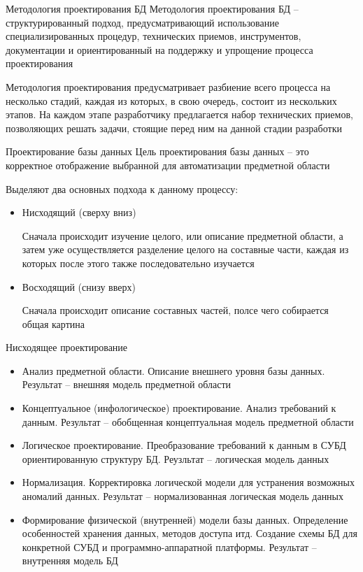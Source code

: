 \documentclass[12pt]{article}
\begin{document}
\begin{defin}{Методология проектирования БД}
    Методология проектирования БД -- структурированный подход, предусматривающий использование специализированных процедур, технических приемов, инструментов, документации и ориентированный на поддержку и упрощение процесса проектирования 

    Методология проектирования предусматривает разбиение всего процесса на несколько стадий, каждая из которых, в свою очередь, состоит из нескольких этапов. На каждом этапе разработчику предлагается набор технических приемов, позволяющих решать задачи, стоящие перед ним на данной стадии разработки 
\end{defin}

\begin{defin}{Проектирование базы данных}
    Цель проектирования базы данных -- это корректное отображение выбранной для автоматизации предметной области 

    Выделяют два основных подхода к данному процессу: 

    \begin{itemize}
        \item Нисходящий (сверху вниз)
        
        Сначала происходит изучение целого, или описание предметной области, а затем уже осуществляется разделение целого на составные части, каждая из которых после этого также последовательно изучается

        \item Восходящий (снизу вверх)
        
        Сначала происходит описание составных частей, полсе чего собирается общая картина 
    \end{itemize}
\end{defin}

\begin{defin}{Нисходящее проектирование}
    \begin{itemize}
        \item Анализ предметной области. Описание внешнего уровня базы данных. Результат -- внешняя модель предметной области 
        \item Концептуальное (инфологическое) проектирование. Анализ требований к данным. Результат -- обобщенная концептуальная модель предметной области 
        \item Логическое проектирование. Преобразование требований к данным в СУБД ориентированную структуру БД. Реузльтат -- логическая модель данных 
        \item Нормализация. Корректировка логической модели для устранения возможных аномалий данных. Результат -- нормализованная логическая модель данных 
        \item Формирование физической (внутренней) модели базы данных. Определение особенностей хранения данных, методов доступа итд. Создание схемы БД для конкретной СУБД и программно-аппаратной платформы. Результат -- внутренняя модель БД 
    \end{itemize}
\end{defin}
\end{document}
